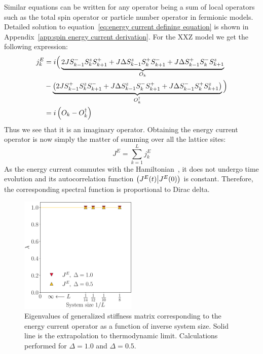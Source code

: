 Similar equations can be written for any operator being a sum of local operators such as
the total spin operator or particle number operator in fermionic models. Detailed solution to equation~\eqref{eq:energy current defining equation}
is shown in Appendix~\ref{app:spin energy current derivation}. For the XXZ model we get the following expression:
\begin{align*}
  j_k^E & = i \Big( \underbrace{2J S^{-}_{k-1}S^{z}_k S^{+}_{k+1} + J \Delta S^{z}_{k-1}S^{+}_k S^{-}_{k+1} + J\Delta S^{+}_{k-1}S^{-}_kS^{z}_{k+1}}_{O_k}                                  \\
        & - \underbrace{\left(2J S^{+}_{k-1}S^{z}_k S^{-}_{k+1} + J\Delta S^{z}_{k-1}S^{-}_k S^{+}_{k+1} + J\Delta S^{-}_{k-1}S^{+}_{k} S^{z}_{k+1} \right)}_{O_k^{\dagger}}\Big) \nonumber \\
        & = i\left(O_k - O_k^{\dagger}\right)
\end{align*}
Thus we see that it is an imaginary operator.
Obtaining the energy current operator is now simply the matter of summing over all the lattice sites:
\begin{equation}
  J^E = \sum_{k=1}^L j_k^E
  \label{eq:energy current}
\end{equation}
As the energy current commutes with the Hamiltonian~\autocite{Zotos1997}, it does not undergo time evolution
and its autocorrelation function \(\left(J^E(t) \middle| J^E(0)\right)\) is constant. Therefore, the corresponding
spectral function is proportional to Dirac delta.
\begin{figure}[htbp]
  \centering
  \includegraphics[width=0.5\textwidth]{Figures/current_int.pdf}
  \caption{Eigenvalues of generalized stiffness matrix corresponding to the energy current
  operator as a function of inverse system size. Solid line is the extrapolation to thermodynamic
  limit. Calculations performed for \(\Delta=1.0\) and \(\Delta=0.5\).}\label{fig: current integrable}
\end{figure}
